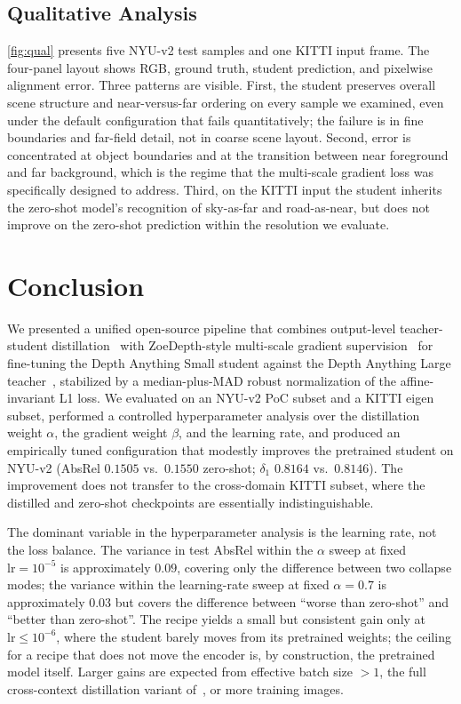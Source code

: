 \documentclass[10pt,twocolumn,letterpaper]{article}
\begin{document}
\subsection{Qualitative Analysis}
\label{sec:qualitative}

\cref{fig:qual} presents five NYU-v2 test samples and one KITTI input
frame. The four-panel layout shows RGB, ground truth, student
prediction, and pixelwise alignment error. Three patterns are visible.
First, the student preserves overall scene structure and near-versus-far
ordering on every sample we examined, even under the default
configuration that fails quantitatively; the failure is in fine
boundaries and far-field detail, not in coarse scene layout. Second,
error is concentrated at object boundaries and at the transition
between near foreground and far background, which is the regime that
the multi-scale gradient loss was specifically designed to address.
Third, on the KITTI input the student inherits the zero-shot model's
recognition of sky-as-far and road-as-near, but does not improve on the
zero-shot prediction within the resolution we evaluate.

\section{Conclusion}
\label{sec:conclusion}

We presented a unified open-source pipeline that combines
output-level teacher-student distillation~\cite{he2025distillanydepth}
with ZoeDepth-style multi-scale gradient supervision~\cite{bhat2023zoedepth}
for fine-tuning the Depth Anything Small student against the Depth
Anything Large teacher~\cite{yang2024depth}, stabilized by a
median-plus-MAD robust normalization of the affine-invariant L1 loss.
We evaluated on an NYU-v2 PoC subset and a KITTI eigen subset, performed
a controlled hyperparameter analysis over the distillation weight
$\alpha$, the gradient weight $\beta$, and the learning rate, and
produced an empirically tuned configuration that modestly improves the
pretrained student on NYU-v2 (AbsRel $0.1505$ vs.\ $0.1550$ zero-shot;
$\delta_1$ $0.8164$ vs.\ $0.8146$). The improvement does not transfer
to the cross-domain KITTI subset, where the distilled and zero-shot
checkpoints are essentially indistinguishable.

The dominant variable in the hyperparameter analysis is the learning
rate, not the loss balance. The variance in test AbsRel within the
$\alpha$ sweep at fixed $\text{lr}=10^{-5}$ is approximately $0.09$,
covering only the difference between two collapse modes; the variance
within the learning-rate sweep at fixed $\alpha=0.7$ is approximately
$0.03$ but covers the difference between ``worse than zero-shot'' and
``better than zero-shot''. The recipe yields a small but consistent
gain only at $\text{lr}\le 10^{-6}$, where the student barely moves
from its pretrained weights; the ceiling for a recipe that does not
move the encoder is, by construction, the pretrained model itself.
Larger gains are expected from effective batch size $> 1$, the full
cross-context distillation variant of~\cite{he2025distillanydepth},
or more training images.
\end{document}
